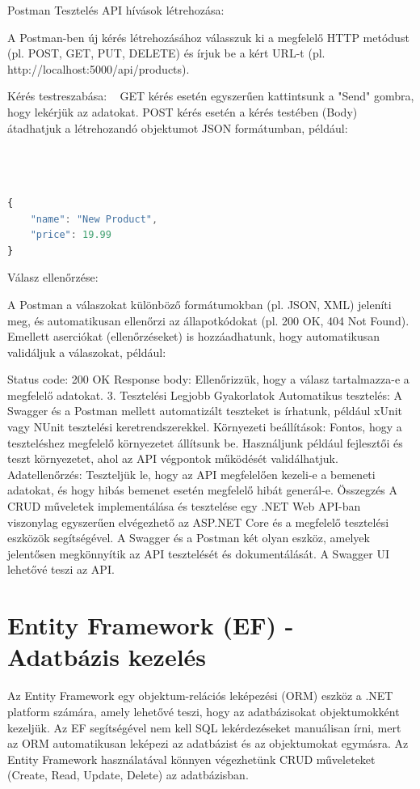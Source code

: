 \documentclass[colorlinks]{thesis-kando}
\theoremstyle{definition}
\theoremstyle{remark}
\begin{document}
Postman Tesztelés
API hívások létrehozása:

A Postman-ben új kérés létrehozásához válasszuk ki a megfelelő HTTP metódust (pl. POST, GET, PUT, DELETE) és írjuk be a kért URL-t (pl. http://localhost:5000/api/products).

Kérés testreszabása: ~
GET kérés esetén egyszerűen kattintsunk a "Send" gombra, hogy lekérjük az adatokat. POST kérés esetén a kérés testében (Body) átadhatjuk a létrehozandó objektumot JSON formátumban, például:

\hspace*{1cm}

\begin{lstlisting}[language=JavaScript]
	
	
	
{
	"name": "New Product",
	"price": 19.99
}
\end{lstlisting}
Válasz ellenőrzése:

A Postman a válaszokat különböző formátumokban (pl. JSON, XML) jeleníti meg, és automatikusan ellenőrzi az állapotkódokat (pl. 200 OK, 404 Not Found). Emellett aserciókat (ellenőrzéseket) is hozzáadhatunk, hogy automatikusan validáljuk a válaszokat, például:

Status code: 200 OK
Response body: Ellenőrizzük, hogy a válasz tartalmazza-e a megfelelő adatokat.
3. Tesztelési Legjobb Gyakorlatok
Automatikus tesztelés: A Swagger és a Postman mellett automatizált teszteket is írhatunk, például xUnit vagy NUnit tesztelési keretrendszerekkel.
Környezeti beállítások: Fontos, hogy a teszteléshez megfelelő környezetet állítsunk be. Használjunk például fejlesztői és teszt környezetet, ahol az API végpontok működését validálhatjuk.
Adatellenőrzés: Teszteljük le, hogy az API megfelelően kezeli-e a bemeneti adatokat, és hogy hibás bemenet esetén megfelelő hibát generál-e.
Összegzés
A CRUD műveletek implementálása és tesztelése egy .NET Web API-ban viszonylag egyszerűen elvégezhető az ASP.NET Core és a megfelelő tesztelési eszközök segítségével. A Swagger és a Postman két olyan eszköz, amelyek jelentősen megkönnyítik az API tesztelését és dokumentálását. A Swagger UI lehetővé teszi az API.

\section {Entity Framework (EF) - Adatbázis kezelés}
Az Entity Framework egy objektum-relációs leképezési (ORM) eszköz a .NET platform számára, amely lehetővé teszi, hogy az adatbázisokat objektumokként kezeljük. Az EF segítségével nem kell SQL lekérdezéseket manuálisan írni, mert az ORM automatikusan leképezi az adatbázist és az objektumokat egymásra. Az Entity Framework használatával könnyen végezhetünk CRUD műveleteket (Create, Read, Update, Delete) az adatbázisban.
\end{document}
